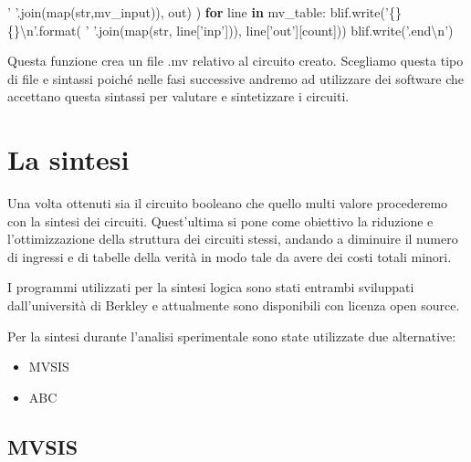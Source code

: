\documentclass[]{book}
\newenvironment{Shaded}{\begin{snugshade}}{\end{snugshade}}
\newcommand{\BuiltInTok}[1]{#1}
\newcommand{\CharTok}[1]{\textcolor[rgb]{0.31,0.60,0.02}{#1}}
\newcommand{\ControlFlowTok}[1]{\textcolor[rgb]{0.13,0.29,0.53}{\textbf{#1}}}
\newcommand{\KeywordTok}[1]{\textcolor[rgb]{0.13,0.29,0.53}{\textbf{#1}}}
\newcommand{\NormalTok}[1]{#1}
\newcommand{\SpecialCharTok}[1]{\textcolor[rgb]{0.00,0.00,0.00}{#1}}
\newcommand{\StringTok}[1]{\textcolor[rgb]{0.31,0.60,0.02}{#1}}
\providecommand{\tightlist}{%
  \setlength{\itemsep}{0pt}\setlength{\parskip}{0pt}}
\begin{document}
\begin{Shaded}
\begin{Highlighting}[]
        \StringTok{' '}\NormalTok{.join(}\BuiltInTok{map}\NormalTok{(}\BuiltInTok{str}\NormalTok{,mv_input)), out)}
\NormalTok{      )}
    \ControlFlowTok{for}\NormalTok{ line }\KeywordTok{in}\NormalTok{ mv_table:}
\NormalTok{      blif.write(}\StringTok{'}\SpecialCharTok{\{\}}\StringTok{ }\SpecialCharTok{\{\}}\CharTok{\textbackslash{}n}\StringTok{'}\NormalTok{.}\BuiltInTok{format}\NormalTok{(}
        \StringTok{' '}\NormalTok{.join(}\BuiltInTok{map}\NormalTok{(}\BuiltInTok{str}\NormalTok{, line[}\StringTok{'inp'}\NormalTok{])), line[}\StringTok{'out'}\NormalTok{][count]))}
\NormalTok{  blif.write(}\StringTok{'.end}\CharTok{\textbackslash{}n}\StringTok{'}\NormalTok{)}
\end{Highlighting}
\end{Shaded}

Questa funzione crea un file .mv relativo al circuito creato. Scegliamo questa tipo di file e sintassi poiché nelle fasi successive andremo ad utilizzare dei software che accettano questa sintassi per valutare e sintetizzare i circuiti.

\newpage

\hypertarget{la-sintesi}{%
\section{La sintesi}\label{la-sintesi}}

Una volta ottenuti sia il circuito booleano che quello multi valore procederemo con la sintesi dei circuiti. Quest'ultima si pone come obiettivo la riduzione e l'ottimizzazione della struttura dei circuiti stessi, andando a diminuire il numero di ingressi e di tabelle della verità in modo tale da avere dei costi totali minori.

I programmi utilizzati per la sintesi logica sono stati entrambi sviluppati dall'università di Berkley e attualmente sono disponibili con licenza open source.

Per la sintesi durante l'analisi sperimentale sono state utilizzate due alternative:

\begin{itemize}
\tightlist
\item
  MVSIS
\item
  ABC
\end{itemize}

\hypertarget{mvsis-1}{%
\subsection{MVSIS}\label{mvsis-1}}
\end{document}
